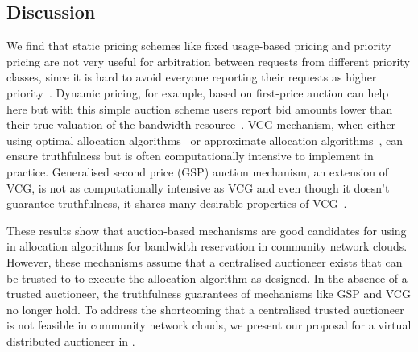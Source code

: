 %
\subsection{Discussion}
\label{sec__truthful_pricing_discussion}

We find that static pricing schemes like fixed usage-based pricing and priority pricing are not very useful for arbitration between requests from different priority classes,
since it is hard to avoid everyone reporting their requests as higher priority~\cite{Maille2014}.
Dynamic pricing, for example, based on first-price auction can help here but with this simple auction scheme users report bid amounts lower than their true valuation of the bandwidth resource~\cite{Maille2014}.
VCG mechanism, when either using optimal allocation algorithms~\cite{Nisan2001} or approximate allocation algorithms~\cite{Zhang2015Truthful}, can ensure truthfulness but is often computationally intensive to implement in practice.
Generalised second price (GSP) auction mechanism, an extension of VCG, is not as computationally intensive as VCG and even though it doesn't guarantee truthfulness, it shares many desirable properties of VCG~\cite{Maille2014}.

These results show that auction-based mechanisms are good candidates 
for using in allocation algorithms for bandwidth reservation in community network clouds.
However, these mechanisms assume that a centralised auctioneer exists that can be trusted to to execute the allocation algorithm as designed.
In the absence of a trusted auctioneer, the truthfulness guarantees of mechanisms like GSP and VCG no longer hold.
To address the shortcoming that a centralised trusted auctioneer is not feasible in community network clouds, 
we present our proposal for a virtual distributed auctioneer in .